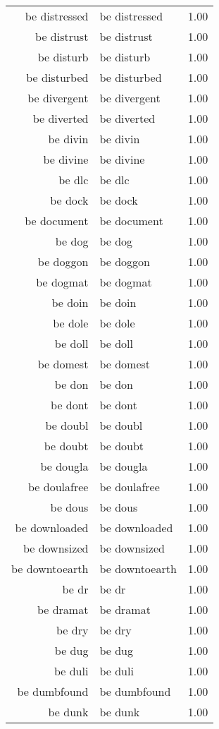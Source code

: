 \begin{table}[ht]
\begin{tabular}{rlr}
  be distressed & be distressed & 1.00 \\ 
  be distrust & be distrust & 1.00 \\ 
  be disturb & be disturb & 1.00 \\ 
  be disturbed & be disturbed & 1.00 \\ 
  be divergent & be divergent & 1.00 \\ 
  be diverted & be diverted & 1.00 \\ 
  be divin & be divin & 1.00 \\ 
  be divine & be divine & 1.00 \\ 
  be dlc & be dlc & 1.00 \\ 
  be dock & be dock & 1.00 \\ 
  be document & be document & 1.00 \\ 
  be dog & be dog & 1.00 \\ 
  be doggon & be doggon & 1.00 \\ 
  be dogmat & be dogmat & 1.00 \\ 
  be doin & be doin & 1.00 \\ 
  be dole & be dole & 1.00 \\ 
  be doll & be doll & 1.00 \\ 
  be domest & be domest & 1.00 \\ 
  be don & be don & 1.00 \\ 
  be dont & be dont & 1.00 \\ 
  be doubl & be doubl & 1.00 \\ 
  be doubt & be doubt & 1.00 \\ 
  be dougla & be dougla & 1.00 \\ 
  be doulafree & be doulafree & 1.00 \\ 
  be dous & be dous & 1.00 \\ 
  be downloaded & be downloaded & 1.00 \\ 
  be downsized & be downsized & 1.00 \\ 
  be downtoearth & be downtoearth & 1.00 \\ 
  be dr & be dr & 1.00 \\ 
  be dramat & be dramat & 1.00 \\ 
  be dry & be dry & 1.00 \\ 
  be dug & be dug & 1.00 \\ 
  be duli & be duli & 1.00 \\ 
  be dumbfound & be dumbfound & 1.00 \\ 
  be dunk & be dunk & 1.00 \\ 

\end{tabular}
\end{table}

